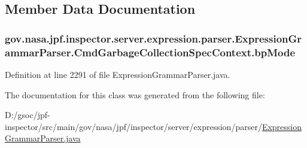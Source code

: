\subsection{Member Data Documentation}
\subsubsection[{\texorpdfstring{bp\+Mode}{bpMode}}]{ gov.\+nasa.\+jpf.\+inspector.\+server.\+expression.\+parser.\+Expression\+Grammar\+Parser.\+Cmd\+Garbage\+Collection\+Spec\+Context.\+bp\+Mode}\hypertarget{classgov_1_1nasa_1_1jpf_1_1inspector_1_1server_1_1expression_1_1parser_1_1_expression_grammar_pa9b16c5c3aaa9986dba28b01bf7446bf9_a1056b2df66c7f35c5a0a38ccad14b861}{}\label{classgov_1_1nasa_1_1jpf_1_1inspector_1_1server_1_1expression_1_1parser_1_1_expression_grammar_pa9b16c5c3aaa9986dba28b01bf7446bf9_a1056b2df66c7f35c5a0a38ccad14b861}


Definition at line 2291 of file Expression\+Grammar\+Parser.\+java.



The documentation for this class was generated from the following file\+:\begin{DoxyCompactItemize}
\item 
D\+:/gsoc/jpf-\/inspector/src/main/gov/nasa/jpf/inspector/server/expression/parser/\hyperlink{_expression_grammar_parser_8java}{Expression\+Grammar\+Parser.\+java}\end{DoxyCompactItemize}
